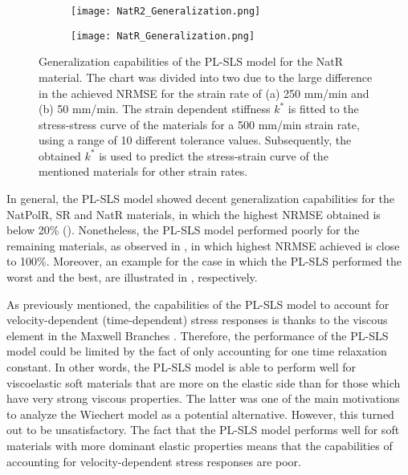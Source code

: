 \begin{figure}[htb!]
	\centering
    \begin{subfigure}[b]{0.49\textwidth}
        \centering
        \texttt{[image: NatR2\_Generalization.png]}
        \caption{}
        \label{fig:GenNatR2}
    \end{subfigure}
    \begin{subfigure}[b]{0.49\textwidth}
        \centering
        \texttt{[image: NatR\_Generalization.png]}
        \caption{}
        \label{fig:GenNatR1}
    \end{subfigure}
    \caption{Generalization capabilities of the PL-SLS model for the NatR material. The chart was divided into two due to the large difference in the achieved NRMSE for the strain rate of (a) 250 mm/min and (b) 50 mm/min. The strain dependent stiffness $k^*$ is fitted to the stress-stress curve of the materials for a 500 mm/min strain rate, using a range of 10 different tolerance values. Subsequently, the obtained $k^*$ is used to predict the stress-strain curve of the mentioned materials for other strain rates.}
    \label{fig:GenOtherAll}
\end{figure}

In general, the PL-SLS model showed decent generalization capabilities for the NatPolR, SR and NatR materials, in which the highest NRMSE obtained is below 20\% (). Nonetheless, the PL-SLS model performed poorly for the remaining materials, as observed in , in which highest NRMSE achieved is close to 100\%. Moreover, an example for the case in which the PL-SLS performed the worst and the best, are illustrated in , respectively.

As previously mentioned, the capabilities of the PL-SLS model to account for velocity-dependent (time-dependent) stress responses is thanks to the viscous element in the Maxwell Branches . Therefore, the performance of the PL-SLS model could be limited by the fact of only accounting for one time relaxation constant. In other words, the PL-SLS model is able to perform well for viscoelastic soft materials that are more on the elastic side than for those which have very strong viscous properties. The latter was one of the main motivations to analyze the Wiechert model as a potential alternative. However, this turned out to be unsatisfactory. The fact that the PL-SLS model performs well for soft materials with more dominant elastic properties means that the capabilities of accounting for velocity-dependent stress responses are poor.

